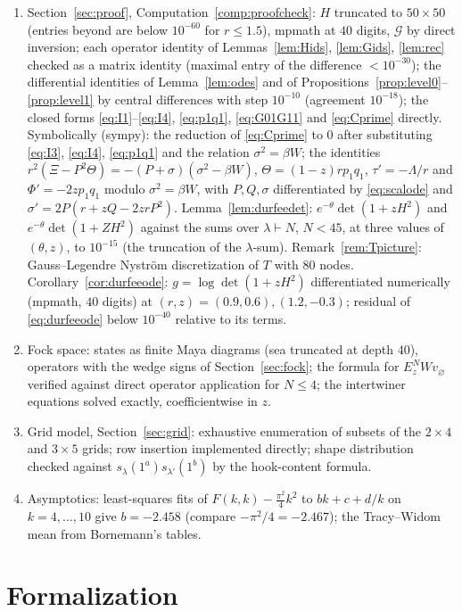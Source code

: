 \documentclass[11pt]{article}
\theoremstyle{definition}
\theoremstyle{remark}
\newcommand{\ket}[1]{v_{#1}}
\begin{document}
\begin{enumerate}[label=(P\arabic*),leftmargin=3em]
\item\label{prov:proof} Section~\ref{sec:proof}, Computation~\ref{comp:proofcheck}: $H$ truncated to $50\times50$ (entries beyond are below $10^{-60}$ for $r\le1.5$), mpmath at $40$ digits, $\mathcal G$ by direct inversion; each operator identity of Lemmas~\ref{lem:Hids}, \ref{lem:Gids}, \ref{lem:rec} checked as a matrix identity (maximal entry of the difference $<10^{-30}$); the differential identities of Lemma~\ref{lem:odes} and of Propositions~\ref{prop:level0}--\ref{prop:level1} by central differences with step $10^{-10}$ (agreement $10^{-18}$); the closed forms \eqref{eq:I1}--\eqref{eq:I4}, \eqref{eq:p1q1}, \eqref{eq:G01G11} and \eqref{eq:Cprime} directly. Symbolically (sympy): the reduction of \eqref{eq:Cprime} to $0$ after substituting \eqref{eq:I3}, \eqref{eq:I4}, \eqref{eq:p1q1} and the relation $\sigma^2=\beta W$; the identities $r^2(\Xi-P^2\Theta)=-(P+\sigma)(\sigma^2-\beta W)$, $\Theta=(1-z)rp_1q_1$, $\tau'=-\Lambda/r$ and $\Phi'=-2zp_1q_1$ modulo $\sigma^2=\beta W$, with $P,Q,\sigma$ differentiated by \eqref{eq:scalode} and $\sigma'=2P(r+zQ-2zrP^2)$. Lemma~\ref{lem:durfeedet}: $e^{-\theta}\det(1+zH^2)$ and $e^{-\theta}\det(1+ZH^2)$ against the sums over $\lambda\vdash N$, $N<45$, at three values of $(\theta,z)$, to $10^{-15}$ (the truncation of the $\lambda$-sum). Remark~\ref{rem:Tpicture}: Gauss--Legendre Nystr\"om discretization of $T$ with $80$ nodes. Corollary~\ref{cor:durfeeode}: $g=\log\det(1+zH^2)$ differentiated numerically (mpmath, $40$ digits) at $(r,z)=(0.9,0.6),(1.2,-0.3)$; residual of \eqref{eq:durfeeode} below $10^{-40}$ relative to its terms.
\item Fock space: states as finite Maya diagrams (sea truncated at depth $40$), operators with the wedge signs of Section~\ref{sec:fock}; the formula for $E_z^NW\ket\varnothing$ verified against direct operator application for $N\le4$; the intertwiner equations solved exactly, coefficientwise in $z$.
\item Grid model, Section~\ref{sec:grid}: exhaustive enumeration of subsets of the $2\times4$ and $3\times5$ grids; row insertion implemented directly; shape distribution checked against $s_\lambda(1^a)s_{\lambda'}(1^b)$ by the hook-content formula.
\item Asymptotics: least-squares fits of $F(k,k)-\frac{\pi^2}4k^2$ to $bk+c+d/k$ on $k=4,\dots,10$ give $b=-2.458$ (compare $-\pi^2/4=-2.467$); the Tracy--Widom mean from Bornemann's tables.
\end{enumerate}

\section{Formalization}\label{app:formal}
\end{document}
